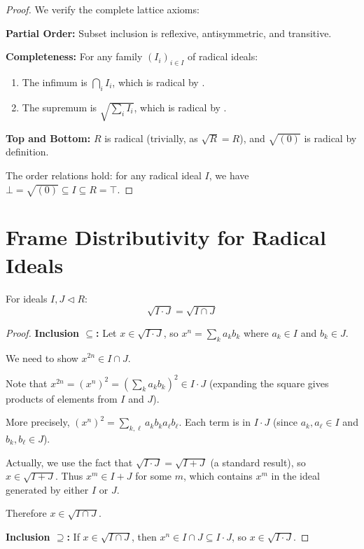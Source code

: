 \begin{proof}
  \leanok
  We verify the complete lattice axioms:

  \textbf{Partial Order:} Subset inclusion is reflexive, antisymmetric, and transitive.

  \textbf{Completeness:} For any family $(I_i)_{i \in I}$ of radical ideals:
  \begin{enumerate}
    \item The infimum is $\bigcap_i I_i$, which is radical by .
    \item The supremum is $\sqrt{\sum_i I_i}$, which is radical by .
  \end{enumerate}

  \textbf{Top and Bottom:} $R$ is radical (trivially, as $\sqrt{R} = R$), and $\sqrt{(0)}$ is radical by definition.

  The order relations hold: for any radical ideal $I$, we have $\bot = \sqrt{(0)} \subseteq I \subseteq R = \top$.
\end{proof}

\section{Frame Distributivity for Radical Ideals}

\begin{lemma}
  \label{lemma:product-radical-property}
  \leanok
  For ideals $I, J \triangleleft R$:
  $$\sqrt{I \cdot J} = \sqrt{I \cap J}$$
\end{lemma}

\begin{proof}
  \leanok
  \textbf{Inclusion $\subseteq$:} Let $x \in \sqrt{I \cdot J}$, so $x^n = \sum_k a_k b_k$ where $a_k \in I$ and $b_k \in J$.
  
  We need to show $x^{2n} \in I \cap J$. 
  
  Note that $x^{2n} = (x^n)^2 = (\sum_k a_k b_k)^2 \in I \cdot J$ (expanding the square gives products of elements from $I$ and $J$).
  
  More precisely, $(x^n)^2 = \sum_{k,\ell} a_k b_k a_\ell b_\ell$. Each term is in $I \cdot J$ (since $a_k, a_\ell \in I$ and $b_k, b_\ell \in J$).
  
  Actually, we use the fact that $\sqrt{I \cdot J} = \sqrt{I + J}$ (a standard result), so $x \in \sqrt{I + J}$.
  Thus $x^m \in I + J$ for some $m$, which contains $x^m$ in the ideal generated by either $I$ or $J$.
  
  Therefore $x \in \sqrt{I \cap J}$.
  
  \textbf{Inclusion $\supseteq$:} If $x \in \sqrt{I \cap J}$, then $x^n \in I \cap J \subseteq I \cdot J$, so $x \in \sqrt{I \cdot J}$.
\end{proof}

